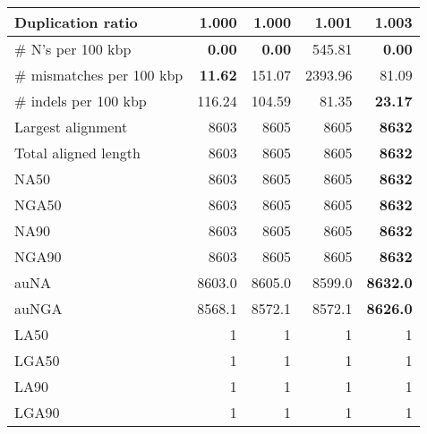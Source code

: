 \documentclass[12pt,a4paper]{article}
\begin{document}
\begin{table}[ht]
\begin{center}
\begin{tabular}{|l*{4}{|r}|}
Duplication ratio & {\bf 1.000} & {\bf 1.000} & 1.001 & 1.003 \\ \hline
\# N's per 100 kbp & {\bf 0.00} & {\bf 0.00} & 545.81 & {\bf 0.00} \\ \hline
\# mismatches per 100 kbp & {\bf 11.62} & 151.07 & 2393.96 & 81.09 \\ \hline
\# indels per 100 kbp & 116.24 & 104.59 & 81.35 & {\bf 23.17} \\ \hline
Largest alignment & 8603 & 8605 & 8605 & {\bf 8632} \\ \hline
Total aligned length & 8603 & 8605 & 8605 & {\bf 8632} \\ \hline
NA50 & 8603 & 8605 & 8605 & {\bf 8632} \\ \hline
NGA50 & 8603 & 8605 & 8605 & {\bf 8632} \\ \hline
NA90 & 8603 & 8605 & 8605 & {\bf 8632} \\ \hline
NGA90 & 8603 & 8605 & 8605 & {\bf 8632} \\ \hline
auNA & 8603.0 & 8605.0 & 8599.0 & {\bf 8632.0} \\ \hline
auNGA & 8568.1 & 8572.1 & 8572.1 & {\bf 8626.0} \\ \hline
LA50 & 1 & 1 & 1 & 1 \\ \hline
LGA50 & 1 & 1 & 1 & 1 \\ \hline
LA90 & 1 & 1 & 1 & 1 \\ \hline
LGA90 & 1 & 1 & 1 & 1 \\ \hline
\end{tabular}
\end{center}
\end{table}
\end{document}
